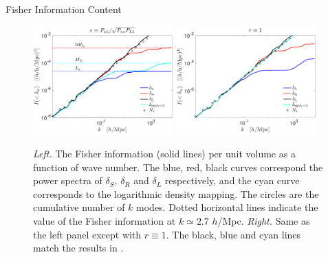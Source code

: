 \begin{section}{Fisher Information Content}
  \begin{figure}
    \includegraphics[width=0.48\textwidth]{fig4a.pdf}
    \includegraphics[width=0.48\textwidth]{fig4b.pdf}
    \centering
    \caption{{\it Left.} The Fisher information (solid lines) per unit volume as
      a function of wave number.  The blue, red, black curves correspond the power spectra
      of $\delta_S$, $\delta_R$ and $\delta_L$ respectively,
      and the cyan curve
      corresponds to the logarithmic density mapping. The circles
      are the cumulative number of $k$ modes.  Dotted horizontal lines indicate the value of the 
      Fisher information at $k \simeq 2.7$ $h$/Mpc.  {\it Right.} Same
      as the left panel except with $r\equiv 1$. The black, blue and cyan lines
      match the results in \cite{bib:Rimes2006,bib:Mark2009}.}
  \label{fig:fisherinfo}
\end{figure}
\end{section}
